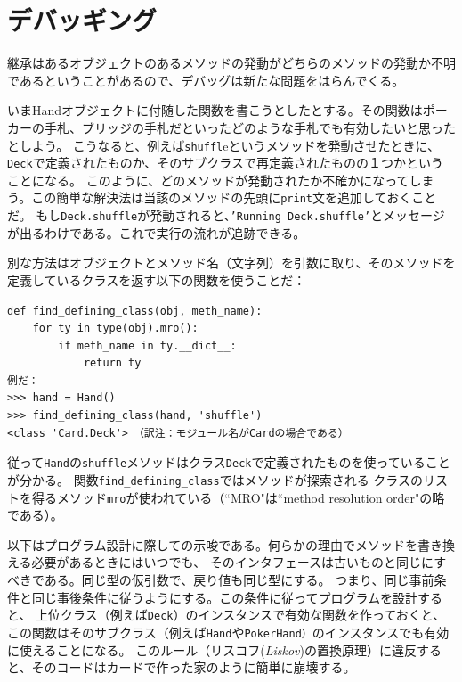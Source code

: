 \documentclass[a4j,12pt,makeidx]{jbook}
\begin{document}
\section{デバッギング}
継承はあるオブジェクトのあるメソッドの発動がどちらのメソッドの発動か不明であるということがあるので、デバッグは新たな問題をはらんでくる。\par
いまHandオブジェクトに付随した関数を書こうとしたとする。その関数はポーカーの手札、ブリッジの手札だといったどのような手札でも有効したいと思ったとしよう。
こうなると、例えば{\tt shuffl}eというメソッドを発動させたときに、
{\tt Deck}で定義されたものか、そのサブクラスで再定義されたものの１つかということになる。
このように、どのメソッドが発動されたか不確かになってしまう。この簡単な解決法は当該のメソッドの先頭に{\tt print}文を追加しておくことだ。
もし{\tt Deck.shuffle}が発動されると、{\tt 'Running Deck.shuffle'}とメッセージが出るわけである。これで実行の流れが追跡できる。\par
別な方法はオブジェクトとメソッド名（文字列）を引数に取り、そのメソッドを定義しているクラスを返す以下の関数を使うことだ：
\begin{verbatim}
def find_defining_class(obj, meth_name):
    for ty in type(obj).mro():
        if meth_name in ty.__dict__:
            return ty
例だ：
>>> hand = Hand()
>>> find_defining_class(hand, 'shuffle')
<class 'Card.Deck'>　（訳注：モジュール名がCardの場合である）
\end{verbatim}
従って{\tt  Hand}の{\tt shuffle}メソッドはクラス{\tt Deck}で定義されたものを使っていることが分かる。
関数{\tt find\_defining\_class}ではメソッドが探索される
クラスのリストを得るメソッド{\tt mro}が使われている（``MRO"は``method resolution order"の略である）。\par
以下はプログラム設計に際しての示唆である。何らかの理由でメソッドを書き換える必要があるときにはいつでも、
そのインタフェースは古いものと同じにすべきである。同じ型の仮引数で、戻り値も同じ型にする。
つまり、同じ事前条件と同じ事後条件に従うようにする。この条件に従ってプログラムを設計すると、
上位クラス（例えば{\tt Deck}）のインスタンスで有効な関数を作っておくと、
この関数はそのサブクラス（例えば{\tt Hand}や{\tt PokerHand）}のインスタンスでも有効に使えることになる。
このルール（リスコフ({\it Liskov})の置換原理）に違反すると、そのコードはカードで作った家のように簡単に崩壊する。
%
\end{document}

